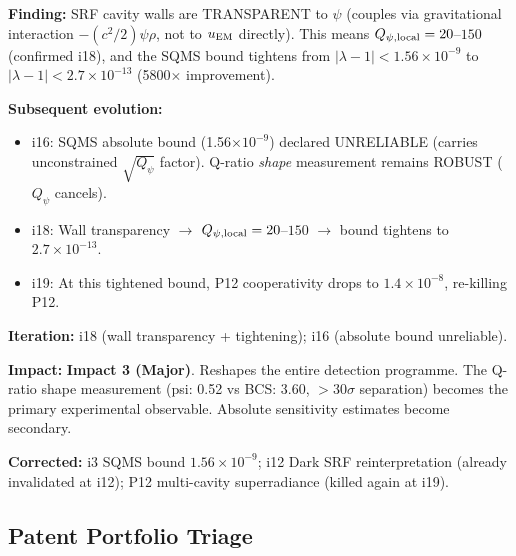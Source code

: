 \documentclass[11pt,a4paper]{article}
\newcommand{\impthree}{\textcolor{impact3}{\textbf{Impact 3 (Major)}}}
\newcommand{\ee}[1]{\times 10^{#1}}
\begin{document}
\begin{tcolorbox}[colback=orange!5!white, colframe=orange!70!black,
  title=\textbf{SQMS Bound Tightening --- Iterations 18--19}]

\textbf{Finding:} SRF cavity walls are TRANSPARENT to $\psi$ (couples
via gravitational interaction $-(c^2/2)\psi\rho$, not to $u_{\rm EM}$
directly). This means $Q_{\psi,\rm local} = 20$--$150$ (confirmed i18),
and the SQMS bound tightens from $|\lambda - 1| < 1.56\ee{-9}$ to
$|\lambda - 1| < 2.7\ee{-13}$ (5800$\times$ improvement).

\textbf{Subsequent evolution:}
\begin{itemize}
  \item i16: SQMS absolute bound (1.56$\ee{-9}$) declared UNRELIABLE
    (carries unconstrained $\sqrt{Q_\psi}$ factor). Q-ratio \emph{shape}
    measurement remains ROBUST ($Q_\psi$ cancels).
  \item i18: Wall transparency $\to$ $Q_{\psi,\rm local} = 20$--$150$
    $\to$ bound tightens to $2.7\ee{-13}$.
  \item i19: At this tightened bound, P12 cooperativity drops to
    $1.4\ee{-8}$, re-killing P12.
\end{itemize}

\textbf{Iteration:} i18 (wall transparency + tightening); i16 (absolute
bound unreliable).

\textbf{Impact:} \impthree. Reshapes the entire detection programme.
The Q-ratio shape measurement (psi: 0.52 vs BCS: 3.60, $>30\sigma$
separation) becomes the primary experimental observable. Absolute
sensitivity estimates become secondary.

\textbf{Corrected:} i3 SQMS bound $1.56\ee{-9}$; i12 Dark SRF
reinterpretation (already invalidated at i12); P12 multi-cavity
superradiance (killed again at i19).

\end{tcolorbox}

\subsection{Patent Portfolio Triage}
\label{sec:patent-triage}
\end{document}
